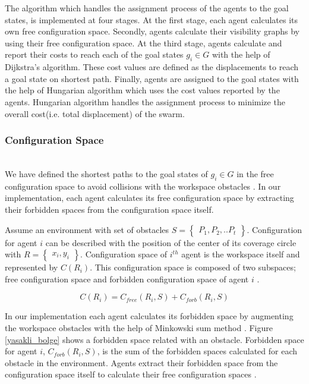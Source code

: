 \documentclass[letterpaper, 10 pt, conference]{ieeeconf}  %
\begin{document}
The algorithm which handles the assignment process of the agents to the goal states, is implemented at four stages. At the first stage, each agent calculates its own free configuration space. Secondly, agents calculate their visibility graphs by using their free configuration space. At the third stage,  agents calculate and report their costs to reach each of the goal states $g_i \in G$ with the help of Dijkstra's algorithm. These cost values are defined as the displacements to reach a goal state on shortest path.  Finally, agents are assigned to the goal states with the help of Hungarian algorithm which uses the cost values reported by the agents. Hungarian algorithm handles the assignment process to minimize the overall cost(i.e. total displacement) of the swarm.
	
\subsubsection{Configuration Space}\hspace{0pt} \\
We have defined the shortest paths to the goal states of $g_i \in G$ in the free configuration space to avoid collisions with the workspace obstacles \cite{92}. In our implementation, each agent calculates its free configuration space by extracting their forbidden spaces from the configuration space itself.

Assume an environment with set of obstacles $S = \begin{Bmatrix}
P_1, P_2, .. P_t \end{Bmatrix}$. Configuration for agent $i$ can be described with the position of the center of its coverage circle with $R=\begin{Bmatrix}x_i, y_i\end{Bmatrix}$. Configuration space of $i^{th}$ agent is the workspace itself and represented by $C(R_i)$. This configuration space is composed of two subspaces; free configuration space and forbidden configuration space of agent $i$ \cite{92}.

\begin{equation}
C(R_i) = C_{free}(R_i,S) + C_{forb}(R_i,S)
\end{equation}

In our implementation each agent calculates its forbidden space by augmenting the workspace obstacles with the help of Minkowski sum method \cite{92}. Figure \ref{yasakli_bolge} shows a forbidden space related with an obstacle. Forbidden space for agent $i$, $C_{forb}(R_i, S)$, is the sum of the forbidden spaces calculated for each obstacle in the environment. Agents extract their forbidden space from the configuration space itself to calculate their free configuration spaces \cite{92}.
\end{document}
